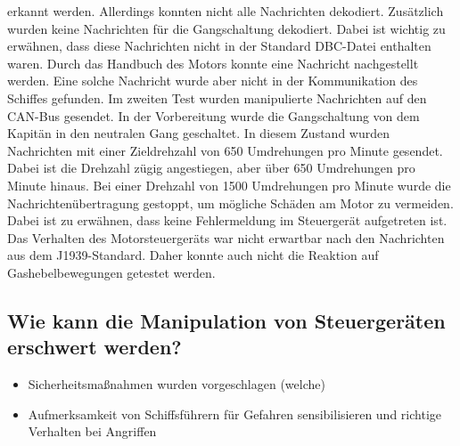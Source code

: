 erkannt werden. Allerdings konnten nicht alle Nachrichten dekodiert. Zusätzlich wurden keine Nachrichten für die Gangschaltung
dekodiert. Dabei ist wichtig zu erwähnen, dass diese Nachrichten nicht in der Standard DBC-Datei enthalten waren. Durch das Handbuch
des Motors konnte eine Nachricht nachgestellt werden. Eine solche Nachricht wurde aber nicht in der Kommunikation des Schiffes gefunden.
Im zweiten Test wurden manipulierte Nachrichten auf den CAN-Bus gesendet. In der Vorbereitung wurde die Gangschaltung von dem Kapitän in den neutralen
Gang geschaltet. In diesem Zustand wurden Nachrichten mit einer Zieldrehzahl von 650 Umdrehungen pro Minute gesendet. Dabei ist die 
Drehzahl zügig angestiegen, aber über 650 Umdrehungen pro Minute hinaus. Bei einer Drehzahl von 1500 Umdrehungen pro Minute wurde die
Nachrichtenübertragung gestoppt, um mögliche Schäden am Motor zu vermeiden. Dabei ist zu erwähnen, dass keine Fehlermeldung im Steuergerät 
aufgetreten ist. Das Verhalten des Motorsteuergeräts war nicht erwartbar nach den Nachrichten aus dem J1939-Standard. Daher
konnte auch nicht die Reaktion auf Gashebelbewegungen getestet werden. 
\subsection{Wie kann die Manipulation von Steuergeräten erschwert werden?}
\begin{itemize}
    \item Sicherheitsmaßnahmen wurden vorgeschlagen (welche)
    \item Aufmerksamkeit von Schiffsführern für Gefahren sensibilisieren und richtige Verhalten bei Angriffen
\end{itemize}
